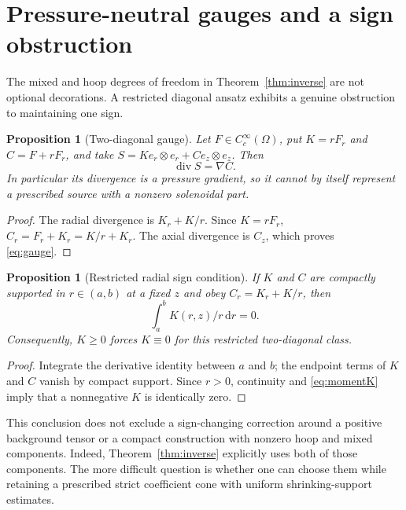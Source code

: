 \documentclass[11pt,a4paper]{article}
\theoremstyle{plain}
\newtheorem{proposition}[theorem]{Proposition}
\theoremstyle{definition}
\newcommand{\diver}{\operatorname{div}}
\newcommand{\cc}{C_c^{\infty}}
\newcommand{\dd}{\,\mathrm{d}}
\begin{document}
\section{Pressure-neutral gauges and a sign obstruction}

The mixed and hoop degrees of freedom in Theorem~\ref{thm:inverse} are
not optional decorations. A restricted diagonal ansatz exhibits a
genuine obstruction to maintaining one sign.

\begin{proposition}[Two-diagonal gauge]\label{prop:gauge}
Let $F\in\cc(\Omega)$, put $K=rF_r$ and $C=F+rF_r$, and take
$S=K e_r\otimes e_r+C e_z\otimes e_z$. Then
\begin{equation}\label{eq:gauge}
 \diver S=\nabla C.
\end{equation}
In particular its divergence is a pressure gradient, so it cannot by
itself represent a prescribed source with a nonzero solenoidal part.
\end{proposition}

\begin{proof}
The radial divergence is $K_r+K/r$. Since $K=rF_r$,
$C_r=F_r+K_r=K/r+K_r$. The axial divergence is $C_z$,
which proves \eqref{eq:gauge}.
\end{proof}

\begin{proposition}[Restricted radial sign condition]\label{prop:sign}
If $K$ and $C$ are compactly supported in $r\in(a,b)$ at a fixed $z$
and obey $C_r=K_r+K/r$, then
\begin{equation}\label{eq:momentK}
 \int_a^b K(r,z)/r\dd r=0.
\end{equation}
Consequently, $K\ge0$ forces $K\equiv0$ for this restricted two-diagonal
class.
\end{proposition}

\begin{proof}
Integrate the derivative identity between $a$ and $b$;
the endpoint terms of $K$ and $C$ vanish by compact support.
Since $r>0$, continuity and \eqref{eq:momentK} imply that a
nonnegative $K$ is identically zero.
\end{proof}

This conclusion does not exclude a sign-changing correction around a
positive background tensor or a compact construction with nonzero
hoop and mixed components. Indeed, Theorem~\ref{thm:inverse} explicitly
uses both of those components. The more difficult question is whether
one can choose them while retaining a prescribed strict coefficient
cone with uniform shrinking-support estimates.
\end{document}
